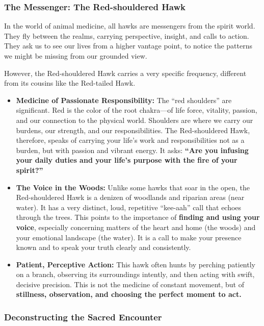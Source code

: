 \documentclass{article}
\begin{document}
\subsubsection*{The Messenger: The Red-shouldered Hawk}\label{the-messenger-the-red-shouldered-hawk}

In the world of animal medicine, all hawks are messengers from the spirit world. They fly between the realms, carrying perspective, insight, and calls to action. They ask us to see our lives from a higher vantage point, to notice the patterns we might be missing from our grounded view.

However, the Red-shouldered Hawk carries a very specific frequency, different from its cousins like the Red-tailed Hawk.

\begin{itemize}
\item
  \textbf{Medicine of Passionate Responsibility:} The ``red shoulders'' are significant. Red is the color of the root chakra---of life force, vitality, passion, and our connection to the physical world. Shoulders are where we carry our burdens, our strength, and our responsibilities. The Red-shouldered Hawk, therefore, speaks of carrying your life's work and responsibilities not as a burden, but with passion and vibrant energy. It asks: \textbf{``Are you infusing your daily duties and your life's purpose with the fire of your spirit?''}
\item
  \textbf{The Voice in the Woods:} Unlike some hawks that soar in the open, the Red-shouldered Hawk is a denizen of woodlands and riparian areas (near water). It has a very distinct, loud, repetitive ``kee-aah'' call that echoes through the trees. This points to the importance of \textbf{finding and using your voice}, especially concerning matters of the heart and home (the woods) and your emotional landscape (the water). It is a call to make your presence known and to speak your truth clearly and consistently.
\item
  \textbf{Patient, Perceptive Action:} This hawk often hunts by perching patiently on a branch, observing its surroundings intently, and then acting with swift, decisive precision. This is not the medicine of constant movement, but of \textbf{stillness, observation, and choosing the perfect moment to act.}
\end{itemize}

\subsubsection*{Deconstructing the Sacred Encounter}\label{deconstructing-the-sacred-encounter}
\end{document}
